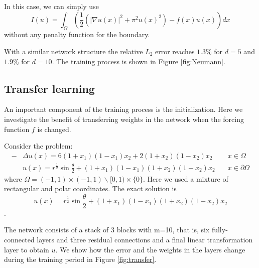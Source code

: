 \documentclass[a4paper,12pt]{article}
\begin{document}
In this case, we can simply use
$$
I(u) = \int_{\Omega} \left( \frac 12 \left( |\nabla u(x)|^2 +\pi^2 u(x)^2 \right)- 
 f(x) u(x) \right) dx
$$
without any penalty function for the boundary.

With a similar network structure the
relative $L_2$ error reaches $1.3\%$ for $d=5$ and $1.9\%$ for $d=10$. 
The training process is shown in Figure \ref{fig:Neumann}.

\subsection{Transfer learning}

An important component of the training process is the initialization.
Here we investigate the benefit of transferring weights in the network
when the forcing function $f$ is changed.

Consider the problem:
\begin{equation}
\begin{aligned}
-&\Delta u(x)=6(1+x_1)(1-x_1)x_2+2(1+x_2)(1-x_2)x_2 &x\in \Omega\\
&u(x)=r^{\frac{1}{2}}\sin{\frac{\theta}{2}}+(1+x_1)(1-x_1)(1+x_2)(1-x_2)x_2 \quad &x\in \partial \Omega
\end{aligned}
\end{equation}
where $\Omega=(-1,1)\times (-1,1) \backslash [0,1)\times \{0\}$.
Here we used a mixture of rectangular and polar coordinates.
The exact solution is $$u(x)=r^{\frac{1}{2}}\sin{\frac{\theta}{2}}+(1+x_1)(1-x_1)(1+x_2)(1-x_2)x_2$$.

The network consists of a stack of 3 blocks with m=10, that is, six fully-connected 
layers and three residual connections and a final linear transformation
layer to obtain $u$.  We show how the error and the weights in the layers 
change during the training period in Figure \ref{fig:transfer}. 



\end{document}
